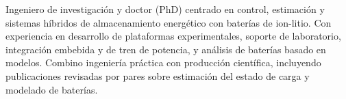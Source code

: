 
\begin{cvparagraph}

Ingeniero de investigaci\'on y doctor (PhD) centrado en control, estimaci\'on y sistemas h\'ibridos de almacenamiento energ\'etico con bater\'ias de ion-litio. Con experiencia en desarrollo de plataformas experimentales, soporte de laboratorio, integraci\'on embebida y de tren de potencia, y an\'alisis de bater\'ias basado en modelos. Combino ingenier\'ia pr\'actica con producci\'on cient\'ifica, incluyendo publicaciones revisadas por pares sobre estimaci\'on del estado de carga y modelado de bater\'ias.

\end{cvparagraph}
